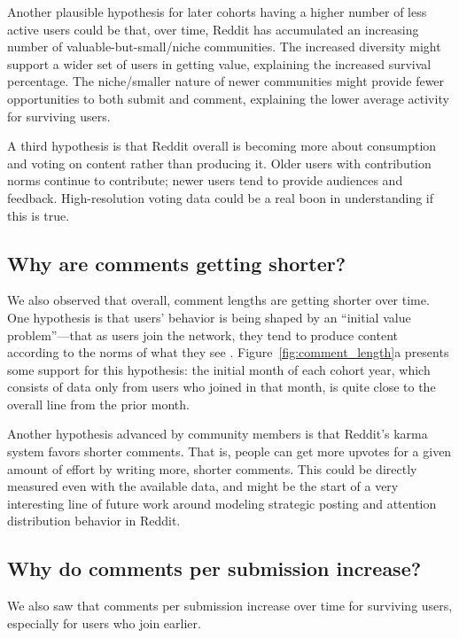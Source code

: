 Another plausible hypothesis for later cohorts having a higher number of less active users could be that, over time, Reddit has accumulated an increasing number of valuable-but-small/niche communities.  The increased diversity might support a wider set of users in getting value, explaining the increased survival percentage.  The niche/smaller nature of newer communities might provide fewer opportunities to both submit and comment, explaining the lower average activity for surviving users. 

A third hypothesis is that Reddit overall is becoming more about consumption and voting on content rather than producing it.  Older users with contribution norms continue to contribute; newer users tend to provide audiences and feedback.  High-resolution voting data could be a real boon in understanding if this is true.

\subsection{Why are comments getting shorter?}

We also observed that overall, comment lengths are getting shorter over time.  
One hypothesis is that users' behavior is being shaped by an ``initial value problem''---that as users join the network, they tend to produce content according to the norms of what they see \cite{Kooti2010, Danescu-niculescu-mizil2013}. 
Figure~\ref{fig:comment_length}a presents some support for this hypothesis: the initial month of each cohort year, which consists of data only from users who joined in that month, is quite close to the overall line from the prior month.  

Another hypothesis advanced by community members\cite{RedditHypo1} is that Reddit's karma system favors shorter comments.  That is, people can get more upvotes for a given amount of effort by writing more, shorter comments.  This could be directly measured even with the available data, and might be the start of a very interesting line of future work around modeling strategic posting and attention distribution behavior in Reddit. 

\subsection{Why do comments per submission increase?}

We also saw that comments per submission increase over time for surviving users, especially for users who join earlier.


